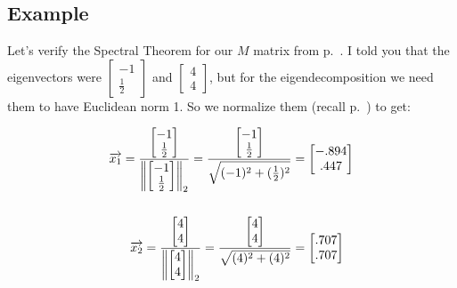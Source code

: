\subsection{Example}

Let's verify the Spectral Theorem for our $M$ matrix from p.~\pageref{mmatrix}.
I told you that the eigenvectors were {\footnotesize $\begin{bmatrix} -1 \\
\frac{1}{2} \end{bmatrix}$} and {\footnotesize $\begin{bmatrix} 4 \\ 4
\end{bmatrix}$}, but for the eigendecomposition we need them to have Euclidean
norm 1. So we normalize them (recall p.~\pageref{normalizing}) to get:


\vspace{-.15in}
\begin{align*}
\overrightarrow{x_1} =
\dfrac{\begin{bmatrix} -1 \\ \frac{1}{2} \end{bmatrix}}
{\left\lVert{\begin{bmatrix} -1 \\ \frac{1}{2} \end{bmatrix}}\right\rVert_2} =
\dfrac{\begin{bmatrix} -1 \\ \frac{1}{2} \end{bmatrix}}
{\sqrt{(-1)^2 + (\frac{1}{2})^2}} &=
\begin{bmatrix} -.894 \\ .447 \end{bmatrix}\\
\medskip\\
\overrightarrow{x_2} =
\dfrac{\begin{bmatrix} 4 \\ 4 \end{bmatrix}}
{\left\lVert{\begin{bmatrix} 4 \\ 4 \end{bmatrix}}\right\rVert_2} =
\dfrac{\begin{bmatrix} 4 \\ 4 \end{bmatrix}}
{\sqrt{(4)^2 + (4)^2}} &=
\begin{bmatrix} .707 \\ .707 \end{bmatrix}\\
\end{align*}
\vspace{-.25in}

